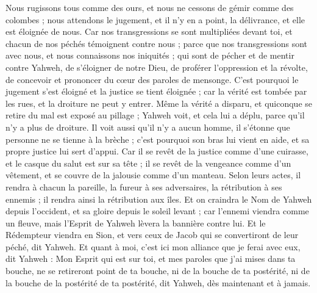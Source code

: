 \begin{multicols}{2}
Nous rugissons tous comme des ours, et nous ne cessons de gémir comme des colombes ; nous attendons le jugement, et il n'y en a point, la délivrance, et elle est éloignée de nous.
Car nos transgressions se sont multipliées devant toi, et chacun de nos péchés témoignent contre nous ; parce que nos transgressions sont avec nous, et nous connaissons nos iniquités ;
qui sont de pécher et de mentir contre Yahweh, de s'éloigner de notre Dieu, de proférer l'oppression et la révolte, de concevoir et prononcer du cœur des paroles de mensonge.
C'est pourquoi le jugement s'est éloigné et la justice se tient éloignée ; car la vérité est tombée par les rues, et la droiture ne peut y entrer.
Même la vérité a disparu, et quiconque se retire du mal est exposé au pillage ; Yahweh voit, et cela lui a déplu, parce qu'il n'y a plus de droiture.
Il voit aussi qu'il n'y a aucun homme, il s'étonne que personne ne se tienne à la brèche ; c'est pourquoi son bras lui vient en aide, et sa propre justice lui sert d'appui.
Car il se revêt de la justice comme d'une cuirasse, et le casque du salut est sur sa tête ; il se revêt de la vengeance comme d'un vêtement, et se couvre de la jalousie comme d'un manteau.
Selon leurs actes, il rendra à chacun la pareille, la fureur à ses adversaires, la rétribution à ses ennemis ; il rendra ainsi la rétribution aux îles.
Et on craindra le Nom de Yahweh depuis l'occident, et sa gloire depuis le soleil levant ; car l'ennemi viendra comme un fleuve, mais l'Esprit de Yahweh lèvera la bannière contre lui.
Et le Rédempteur viendra en Sion, et vers ceux de Jacob qui se convertiront de leur péché, dit Yahweh.
Et quant à moi, c'est ici mon alliance que je ferai avec eux, dit Yahweh : Mon Esprit qui est sur toi, et mes paroles que j'ai mises dans ta bouche, ne se retireront point de ta bouche, ni de la bouche de ta postérité, ni de la bouche de la postérité de ta postérité, dit Yahweh, dès maintenant et à jamais.

\end{multicols}
